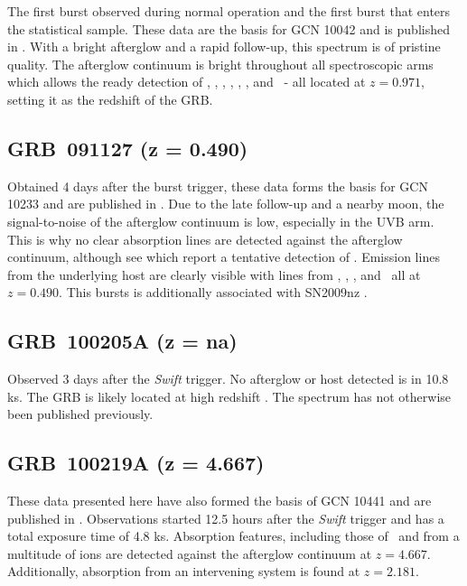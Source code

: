 \documentclass[longauth]{aa}    %
\begin{document}
The first burst observed during normal operation and the first burst that enters
the statistical sample. These data are the basis for GCN 10042 \citep{GCN10042}
and is published in \citet{Wiersema2012}. With a bright afterglow and a rapid
follow-up, this spectrum is of pristine quality. The afterglow continuum is
bright throughout all spectroscopic arms which allows the ready detection of
\alii, \aliii, \feii, \mnii, \mgii, \mgi, and \caii~- all located at $z =
0.971$, setting it as the redshift of the GRB.

\subsection{GRB~091127 (z = 0.490)} \label{091127}

Obtained 4 days after the burst trigger, these data forms the basis for GCN 10233
\citep{GCN10233} and are published in \citet{Vergani2011}. Due to the late
follow-up and a nearby moon, the signal-to-noise of the afterglow continuum is
low, especially in the UVB arm. This is why no clear absorption lines are detected
against the afterglow continuum, although see \citet{Vergani2011} which report a
tentative detection of \mgii. Emission lines from the underlying host are clearly
visible with lines from \oii, \hb, \oiii, and \ha~all at $z = 0.490$. This
bursts is additionally associated with SN2009nz \citep{Cobb2010, Berger2011, Olivares2015}.

\subsection{GRB~100205A  (z = na)} \label{100205}

Observed 3 days after the \textit{Swift} trigger. No afterglow or host detected
is in 10.8 ks. The GRB is likely located at high redshift \citep[GCN
GCN10399;][]{GCN10399}. The spectrum has not otherwise been published
previously.

\subsection{GRB~100219A (z = 4.667)} \label{100219}

These data presented here have also formed the basis of GCN 10441 \citep{GCN10441} and
are published in \citet{Thone2013}. Observations started 12.5 hours after the
\textit{Swift} trigger and has a total exposure time of 4.8 ks. Absorption
features, including those of \lya~and from a multitude of ions are detected
against the afterglow continuum at $z = 4.667$. Additionally, absorption from an
intervening system is found at $z = 2.181$.
\end{document}
